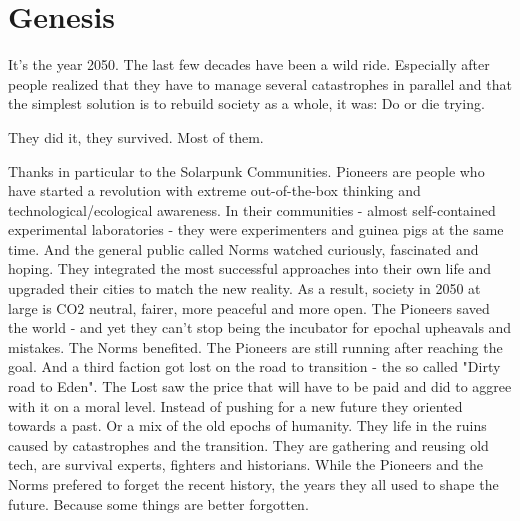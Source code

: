 \chapter{Genesis}

It's the year 2050. The last few decades have been a wild ride. Especially after people realized that they have to manage several catastrophes in parallel and that the simplest solution is to rebuild society as a whole, it was: Do or die trying.

They did it, they survived. Most of them.

Thanks in particular to the Solarpunk Communities. Pioneers are people who have started a revolution with extreme out-of-the-box thinking and technological/ecological awareness. In their communities - almost self-contained experimental laboratories - they were experimenters and guinea pigs at the same time. And the general public called Norms watched curiously, fascinated and hoping. They integrated the most successful approaches into their own life and upgraded their cities to match the new reality.
As a result, society in 2050 at large is CO2 neutral, fairer, more peaceful and more open.
The Pioneers saved the world - and yet they can't stop being the incubator for epochal upheavals and mistakes.
The Norms benefited. The Pioneers are still running after reaching the goal. And a third faction got lost on the road to transition - the so called "Dirty road to Eden". The Lost saw the price that will have to be paid and did to aggree with it on a moral level. Instead of pushing for a new future they oriented towards a past. Or a mix of the old epochs of humanity. They life in the ruins caused by catastrophes and the transition. They are gathering and reusing old tech, are survival experts, fighters and historians.
While the Pioneers and the Norms prefered to forget the recent history, the years they all used to shape the future. Because some things are better forgotten.